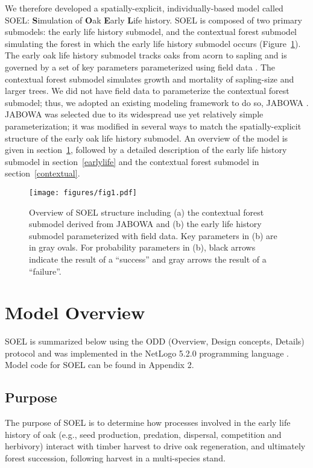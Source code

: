 \documentclass[
11pt, %
a4paper, %
oneside, %
headinclude,footinclude, %
]{scrartcl}
\begin{document}
We therefore developed a spatially-explicit, individually-based model called SOEL: \textbf{S}imulation of \textbf{O}ak \textbf{E}arly \textbf{L}ife history. SOEL is composed of two primary submodels: the early life history submodel, and the contextual forest submodel simulating the forest in which the early life history submodel occurs (Figure~\ref{fig:1}). The early oak life history submodel tracks oaks from acorn to sapling and is governed by a set of key parameters parameterized using field data \citep{Kellner2014b, Kellner2015a, Kellner2016}. The contextual forest submodel simulates growth and mortality of sapling-size and larger trees. We did not have field data to parameterize the contextual forest submodel; thus, we adopted an existing modeling framework to do so, JABOWA \citep{Botkin1993}. JABOWA was selected due to its widespread use yet relatively simple parameterization; it was modified in several ways to match the spatially-explicit structure of the early oak life history submodel. An overview of the model is given in section~\ref{overview}, followed by a detailed description of the early life history submodel in section~\ref{earlylife} and the contextual forest submodel in section~\ref{contextual}.

\begin{figure}
	\centering
	\texttt{[image: figures/fig1.pdf]}
	\caption{Overview of SOEL structure including (a) the contextual forest submodel derived from JABOWA and (b) the early life history submodel parameterized with field data. Key parameters in (b) are in gray ovals. For probability parameters in (b), black arrows indicate the result of a ``success'' and gray arrows the result of a ``failure''.}
	\label{fig:1}
\end{figure}

\section{Model Overview}
\label{overview}

SOEL is summarized below using the ODD (Overview, Design concepts, Details) protocol \citep{Grimm2010} and was implemented in the NetLogo 5.2.0 programming language \citep{Wilensky1999}. Model code for SOEL can be found in Appendix 2.

\subsection{Purpose}

The purpose of SOEL is to determine how processes involved in the early life history of oak (e.g., seed production, predation, dispersal, competition and herbivory) interact with timber harvest to drive oak regeneration, and ultimately forest succession, following harvest in a multi-species stand.
\end{document}
